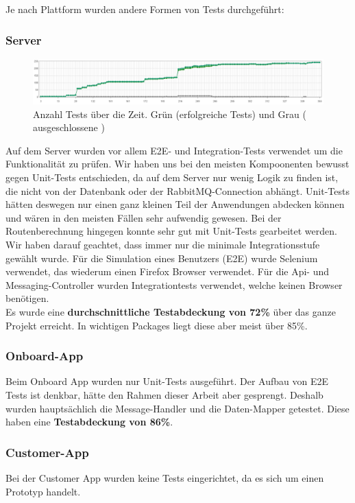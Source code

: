 Je nach Plattform wurden andere Formen von Tests durchgeführt:

\subsubsection{Server}
\begin{figure}[h]
	\centering
	\includegraphics[width=1\textwidth] {images/test-count-chart.png}
	\caption{Anzahl Tests über die Zeit. Grün (erfolgreiche Tests) und Grau ( ausgeschlossene )}
\end{figure}

Auf dem Server wurden vor allem E2E- und Integration-Tests verwendet um die Funktionalität zu prüfen. Wir haben uns bei den meisten Kompoonenten bewusst gegen Unit-Tests entschieden, da auf dem Server nur wenig Logik zu finden ist, die nicht von der Datenbank oder der RabbitMQ-Connection abhängt. Unit-Tests hätten deswegen nur einen ganz kleinen Teil der Anwendungen abdecken können und wären in den meisten Fällen sehr aufwendig gewesen. Bei der Routenberechnung hingegen konnte sehr gut mit Unit-Tests gearbeitet werden.\\

Wir haben darauf geachtet, dass immer nur die minimale Integrationsstufe gewählt wurde. Für die Simulation eines Benutzers (E2E) wurde Selenium verwendet, das wiederum einen Firefox Browser verwendet. Für die Api- und Messaging-Controller wurden Integrationtests verwendet, welche keinen Browser benötigen.\\

Es wurde eine \textbf{durchschnittliche Testabdeckung von 72\%} über das ganze Projekt erreicht. In wichtigen Packages liegt diese aber meist über 85\%.

\subsubsection{Onboard-App}

Beim Onboard App wurden nur Unit-Tests ausgeführt. Der Aufbau von E2E Tests ist denkbar, hätte den Rahmen dieser Arbeit aber gesprengt. Deshalb wurden hauptsächlich die Message-Handler und die Daten-Mapper getestet. Diese haben eine \textbf{Testabdeckung von 86\%}.

\subsubsection{Customer-App}

Bei der Customer App wurden keine Tests eingerichtet, da es sich um einen Prototyp handelt.


